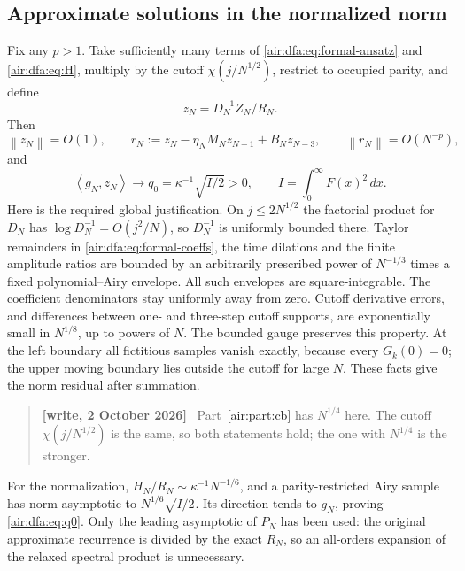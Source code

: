 \documentclass[11pt,letterpaper]{article}
\numberwithin{equation}{section}
\theoremstyle{remark}
\newcommand{\norm}[1]{\left\lVert#1\right\rVert}
\newcommand{\ip}[2]{\left\langle#1,#2\right\rangle}
\newenvironment{writenote}{\par\smallskip\begin{quote}\small\textbf{[write, 2 October 2026]}\ }{\end{quote}\smallskip}
\begin{document}
\subsection{Approximate solutions in the normalized norm}
Fix any $p>1$. Take sufficiently many terms of \eqref{air:dfa:eq:formal-ansatz} and
\eqref{air:dfa:eq:H}, multiply by the cutoff $\chi(j/N^{1/2})$, restrict to occupied
parity, and define
\[
z_N=D_N^{-1}Z_N/R_N.
\]
Then
\begin{equation}\label{air:dfa:eq:residual}
\norm{z_N}=O(1),\qquad
r_N:=z_N-\eta_NM_Nz_{N-1}+B_Nz_{N-3},\qquad
\norm{r_N}=O(N^{-p}),
\end{equation}
and
\begin{equation}\label{air:dfa:eq:q0}
\ip{g_N}{z_N}\longrightarrow q_0=\kappa^{-1}\sqrt{I/2}>0,\qquad
I=\int_0^\infty F(x)^2\,dx.
\end{equation}
Here is the required global justification. On $j\le2N^{1/2}$ the factorial
product for $D_N$ has $\log D_N^{-1}=O(j^2/N)$, so $D_N^{-1}$ is uniformly
bounded there. Taylor remainders in \eqref{air:dfa:eq:formal-coeffs}, the time
dilations and the finite amplitude ratios are bounded by an arbitrarily
prescribed power of $N^{-1/3}$ times a fixed polynomial--Airy envelope.
All such envelopes are square-integrable. The coefficient denominators
stay uniformly away from zero. Cutoff derivative errors, and differences
between one- and three-step cutoff supports, are exponentially small in
$N^{1/8}$, up to powers of $N$. The bounded gauge preserves this property.
At the left boundary all fictitious samples vanish exactly, because every
$G_k(0)=0$; the upper moving boundary lies outside the cutoff for large $N$.
These facts give the norm residual after summation.
\begin{writenote}
Part~\ref{air:part:cb} has $N^{1/4}$ here. The cutoff $\chi(j/N^{1/2})$ is the same, so both statements hold; the one with $N^{1/4}$ is the stronger.
\end{writenote}


For the normalization, $H_N/R_N\sim\kappa^{-1}N^{-1/6}$, and a
parity-restricted Airy sample has norm asymptotic to
$N^{1/6}\sqrt{I/2}$. Its direction tends to $g_N$, proving
\eqref{air:dfa:eq:q0}. Only the leading asymptotic of $P_N$ has been used:
the original approximate recurrence is divided by the exact $R_N$, so an
all-orders expansion of the relaxed spectral product is unnecessary.
\end{document}
